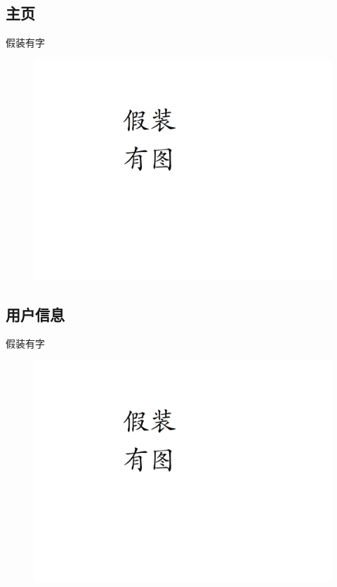 \documentclass[UTF8]{ctexart}
\begin{document}
\newpage
\subsection{主页}
假装有字
\begin{figure}[h]
    \centering
    \includegraphics[width=\textwidth]{manual_images//temp.png}
\end{figure}

\newpage
\subsection{用户信息}
假装有字
\begin{figure}[h]
    \centering
    \includegraphics[width=\textwidth]{manual_images//temp.png}
\end{figure}
\end{document}
